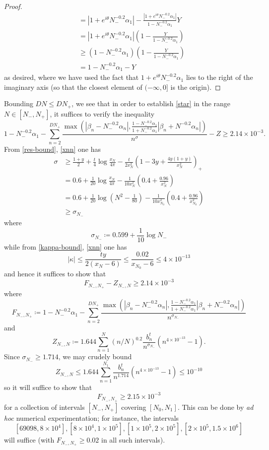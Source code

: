 \begin{proof}
\begin{align*}
&= |1 + e^{i\theta} N_-^{-0.2} \alpha_1| - \frac{|1+e^{i\theta} N_-^{-0.2} \alpha_1|}{1-N_-^{-0.2} \alpha_1} Y  \\
&= |1 + e^{i\theta} N_-^{-0.2} \alpha_1| (1 - \frac{Y}{1-N_-^{-0.2} \alpha_1} ) \\
&\geq (1-N_-^{-0.2} \alpha_1) (1 - \frac{Y}{1-N_-^{-0.2} \alpha_1} ) \\
&= 1 - N_-^{-0.2} \alpha_1 - Y
\end{align*}
as desired, where we have used the fact that $1+e^{i\theta} N_-^{-0.2} \alpha_1$ lies to the right of the imaginary axis (so that the closest element of $(-\infty,0]$ is the origin).
\end{proof}

Bounding $DN \leq DN_+$, we see that in order to establish \eqref{star} in the range $N \in [N_-, N_+]$, it suffices to verify the inequality
$$ 1 - N_-^{-0.2} \alpha_1 - \sum_{n=2}^{DN_+} \frac{\max(|\beta_n-N_-^{-0.2} \alpha_n|, \frac{1-N_-^{-0.2} \alpha_1}{1+N_-^{-0.2} \alpha_1} |\beta_n+N^{-0.2} \alpha_n|)}{n^{\sigma}} - Z
\geq 2.14 \times 10^{-3}.$$
From \eqref{res-bound}, \eqref{xnn} one has 
\begin{align*}
 \sigma &\geq \frac{1+y}{2} +\frac{t}{4} \log \frac{x_N}{4\pi} - \frac{t}{2x_N^2} \left(1-3y+\frac{4y(1+y)}{x_N^2}\right)_+ \\
&= 0.6 + \frac{1}{20} \log \frac{x_N}{4\pi} - \frac{1}{10 x_N^2} ( 0.4 + \frac{0.96}{x_N^2} ) \\
&= 0.6 + \frac{1}{20} \log (N^2 - \frac{1}{80}) - \frac{1}{10 x_{N_0}^2} ( 0.4 + \frac{0.96}{x_{N_0}^2} ) \\
&\geq \sigma_{N_-}
\end{align*}
where
$$ \sigma_{N_-} \coloneqq 0.599 + \frac{1}{10} \log N_- $$
while from \eqref{kappa-bound}, \eqref{xnn} one has
$$ |\kappa| \leq \frac{ty}{2(x_N-6)} \leq \frac{0.02}{x_{N_0}-6} \leq 4 \times 10^{-13}$$
and hence it suffices to show that
$$ F_{N_-,N_+} - Z_{N_-,N} \geq 2.14 \times 10^{-3}$$
where
$$ F_{N_-,N_+} \coloneqq 1 - N_-^{-0.2} \alpha_1 - \sum_{n=2}^{DN_+} \frac{\max(|\beta_n-N_-^{-0.2} \alpha_n|, \frac{1-N_-^{-0.2} \alpha_1}{1+N_-^{-0.2} \alpha_1} |\beta_n+N_-^{-0.2} \alpha_n|)}{n^{\sigma_{N_-}}}$$
and
$$ Z_{N_-,N} \coloneqq 1.644 \sum_{n=1}^N (n/N)^{0.2} \frac{b_n^t}{n^{\sigma_{N_-}}} (n^{4 \times 10^{-13}}-1).$$
Since $\sigma_{N_-} \geq 1.714$, we may crudely bound
$$ Z_{N_-,N} \leq 1.644 \sum_{n=1}^{N_1} \frac{b_n^t}{n^{1.714}} (n^{4 \times 10^{-13}}-1) \leq 10^{-10}$$
so it will suffice to show that
$$ F_{N_-,N_+} \geq 2.15 \times 10^{-3}$$
for a collection of intervals $[N_-,N_+]$ covering $[N_0, N_1]$.  This can be done by \emph{ad hoc} numerical experimentation; for instance, the intervals
$$ [69098, 8 \times 10^4], [8 \times 10^4, 1 \times 10^5], [1 \times 10^5, 2 \times 10^5], [2 \times 10^5, 1.5 \times 10^6]$$
will suffice (with $F_{N_-, N_+} \geq 0.02$ in all such intervals).
